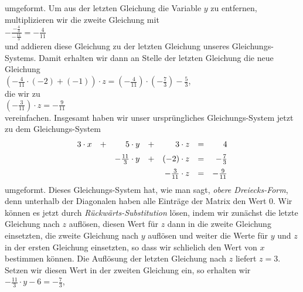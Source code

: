umgeformt.  Um aus der letzten Gleichung die Variable $y$ zu entfernen, multiplizieren wir die zweite
Gleichung mit
\\[0.2cm]
\hspace*{1.3cm}
$\displaystyle -\frac{-\frac{4}{3}}{-\frac{11}{3}} = -\frac{4}{11}$
\\[0.2cm]
und addieren diese Gleichung zu der letzten Gleichung unseres Gleichungs-Systems.  Damit erhalten wir
dann an Stelle der letzten Gleichung die neue Gleichung
\\[0.2cm]
\hspace*{1.3cm}
$\left(-\frac{4}{11} \cdot (-2) + (-1)\right) \cdot z = 
 \left(-\frac{4}{11}\right) \cdot \left(-\frac{7}{3}\right) - \frac{5}{3}
$,
\\[0.2cm]
die wir zu
\\[0.2cm]
\hspace*{1.3cm}
$\left(-\frac{3}{11}\right) \cdot z = -\frac{9}{11}$
\\[0.2cm]
vereinfachen.  Insgesamt haben wir unser urspr\"{u}ngliches Gleichungs-System jetzt zu dem Gleichungs-System
\begin{equation}
  \label{eq:gauss2} 
\begin{array}[c]{rcrcrcr}
  3 \cdot x & + & 5 \cdot y             & + &    3 \cdot z  & = &           4  \\[0.2cm]
            &   & -\frac{11}{3} \cdot y & + & (-2) \cdot z  & = & -\frac{7}{3} \\[0.2cm]
            &   &                       &   & -\frac{3}{11} \cdot z & = & -\frac{9}{11}
\end{array}
\end{equation}
umgeformt.  Dieses Gleichungs-System hat, wie man sagt, \emph{obere Dreiecks-Form}, denn
unterhalb der Diagonalen haben alle Eintr\"{a}ge der Matrix den Wert $0$.
Wir k\"{o}nnen es jetzt durch
\emph{R\"{u}ckw\"{a}rts-Substitution} l\"{o}sen, indem wir zun\"{a}chst die letzte Gleichung nach $z$ aufl\"{o}sen, diesen
Wert f\"{u}r $z$ dann in die zweite Gleichung einsetzten, die zweite Gleichung nach $y$ aufl\"{o}sen und weiter
die Werte f\"{u}r $y$ und $z$ in der ersten Gleichung einsetzten, so dass wir schlie\3lich den Wert von $x$
bestimmen k\"{o}nnen.  Die Aufl\"{o}sung der letzten Gleichung nach $z$ liefert $z = 3$.  Setzen wir diesen Wert
in der zweiten Gleichung ein, so erhalten wir
\\[0.2cm]
\hspace*{1.3cm} $-\frac{11}{3} \cdot y - 6 = -\frac{7}{3}$,
\\[0.2cm]
